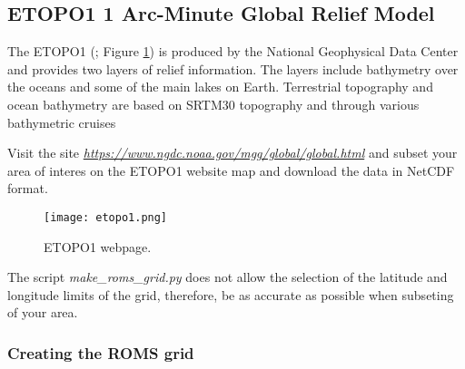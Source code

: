 \subsection{ETOPO1 1 Arc-Minute Global Relief Model}
\bigskip

\noindent The ETOPO1 (\cite{Amante2009}; Figure \textcolor{bleu_cite}{\ref{etopo1}}) 
is produced by the National Geophysical Data Center and provides two layers of relief information.
The layers include bathymetry over the oceans and some of the main lakes on Earth.
 Terrestrial topography and ocean bathymetry are based on SRTM30 topography and through various bathymetric cruises
\bigskip

\noindent Visit the site \textcolor{bleu_cite}{\href{https://www.ngdc.noaa.gov/mgg/global/global.html}{\textit{https://www.ngdc.noaa.gov/mgg/global/global.html}}} 
and subset your area of interes on the ETOPO1 website map and download the data in NetCDF format.

\bigskip  
   
\begin{figure}[H]
    \centering
    \texttt{[image: etopo1.png]}
    \caption{ETOPO1 webpage.}
    \label{etopo1}
\end{figure}
\bigskip


\bigskip

\begin{tcolorbox}[enhanced,
    grow to left by   = 0cm,
    grow to right by  = 0cm,
    enlarge top by    = 0cm,
    enlarge bottom by = 0cm,
    tcbox raise base,
    boxrule           = 1.0pt,
    left              = 18mm,
    colframe          = red!50!black,coltext=red!25!black,colback=red!10!white,
    overlay           = {\begin{tcbclipinterior}\fill[red!75!blue!50!white] (frame.south west)
      rectangle node[text=white,font=\sffamily\bfseries\footnotesize,rotate=0] {WARNING} ([xshift=18mm]frame.north west);\end{tcbclipinterior}}]
The script \textit{make\_roms\_grid.py} does not allow the selection of the latitude and longitude limits of the grid, therefore, be as accurate as possible when subseting of your area.

\end{tcolorbox}
\bigskip

\subsubsection{Creating the ROMS grid}


